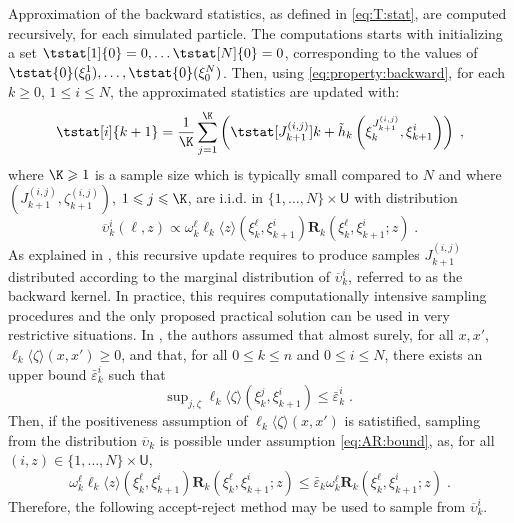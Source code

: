 \documentclass[12pt]{article}
\newcommand{\addf}[1]{\termletter_{#1}}
\newcommand{\termletter}{\tilde{h}}
\newcommand{\N}{N}
\newcommand{\hkup}{\bar{\varepsilon}}
\newcommand{\bi}[3]{J_{#1}^{(#2, #3)}}
\newcommand{\eqsp}{\;}
\newcommand{\ewght}[2]{\ensuremath{\omega_{#1}^{#2}}}
\newcommand{\epart}[2]{\ensuremath{\xi_{#1}^{#2}}}
\newcommand{\marginalset}{\mathsf{U}}
\newcommand{\kernelmarg}{\mathbf{R}}
\newcommand{\hatqg}[1]{\mathsf{\ell}_{#1}}
\begin{document}
Approximation of the backward statistics, as defined in \eqref{eq:T:stat}, are computed recursively, for each simulated particle. 
The computations starts with initializing a set $\tstat[1]{0} = 0,\dots \tstat[N]{0} = 0$, corresponding to the values of $\tstat{0}(\epart{0}{1}), \dots, \tstat{0}(\epart{0}{N})$.  Then, using \eqref{eq:property:backward}, for each $k\geqslant 0$, $1\leqslant i\leqslant \N$, the approximated statistics are updated with:
\begin{equation}
\label{eq:update:paris:marginal}
\tstat[i]{k+1}  = \frac{1}{\K} \sum_{j=1}^{\K} \left( \tstat[\bi{k+1}{i}{j}]{k} + \addf{k}\left(\epart{k}{\bi{k+1}{i}{j}}, \epart{k+1}{i}\right)\right)\eqsp,
\end{equation}
where $\K\geqslant 1$ is a sample size which  is typically small compared to $\N$ and where $(\bi{k+1}{i}{j},\zeta_{k+1}^{(i,j)})$, $1\leqslant j\leqslant \K$, are i.i.d. in $\{1,\ldots,\N\}\times\marginalset$ with distribution 
$$
\overline \upsilon_k^i(\ell,z)\propto\ewght{k}{\ell}\hatqg{k}\langle z\rangle(\epart{k}{\ell},\epart{k+1}{i})\kernelmarg_{k}(\epart{k}{\ell},\epart{k+1}{i};z)\eqsp.
$$
As explained in \cite{gloaguen2021pseudo}, this recursive update requires to produce samples $\bi{k+1}{i}{j}$ distributed according to the marginal  distribution of $\overline \upsilon_k^i$, referred to as the backward kernel. In practice, this requires computationally intensive sampling procedures and the only proposed practical solution can be used in very restrictive situations.  
In \cite{gloaguen2018online}, the authors assumed that  almost surely, for all $x,x'$, $\hatqg{k}\langle \zeta\rangle(x, x')\geqslant 0$, and that, for all  $0\leqslant k\leqslant n$ and $0\leqslant i\leqslant N$, there exists an upper bound $\hkup^i_k$  such that
\begin{equation}
\mathrm{sup}_{j,\zeta}\;\hatqg{k}\langle \zeta\rangle(\epart{k}{j},\epart{k+1}{i})\leqslant \hkup^i_k\eqsp. \label{eq:AR:bound}
\end{equation}
Then,  if the positiveness assumption of  $\hatqg{k}\langle \zeta\rangle(x, x')$ is satistified, sampling from the distribution $\overline\upsilon_k$ is possible under assumption \eqref{eq:AR:bound}, as, for all $(i, z) \in \lbrace 1,\dots,N\rbrace\times\marginalset$, 
$$
\ewght{k}{\ell}\hatqg{k}\langle z \rangle(\epart{k}{\ell},\epart{k+1}{i})\kernelmarg_{k}(\epart{k}{\ell},\epart{k+1}{i};z) \leqslant \hkup_k \ewght
{k}{\ell} \kernelmarg_{k}(\epart{k}{\ell},\epart{k+1}{i};z)\eqsp. 
$$
Therefore, the following  accept-reject method may be used to sample from $\overline \upsilon_k^i$.
\end{document}
